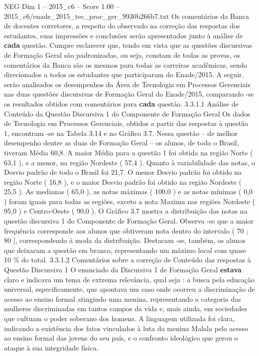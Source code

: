 \begin{textsample}{NEG Dim 1 – 2015\_c6 – Score 1.00 – 2015\_c6/enade\_2015\_tec\_proc\_ger\_9930b266b7.txt}
Os comentários da Banca de docentes corretores, a respeito do observado na correção das respostas dos estudantes, suas impressões e conclusões serão apresentados junto à análise de \textbf{cada} questão.
Cumpre esclarecer que, tendo em vista que as questões discursivas de Formação Geral são padronizadas, ou seja, constam de todas as provas, os comentários da Banca são os mesmos para todas as carreiras acadêmicas, sendo direcionados a todos os estudantes que participaram do Enade/2015.
A seguir, serão analisados os desempenhos da Área de Tecnologia em Processos Gerenciais nas duas questões discursivas de Formação Geral do Enade/2015, comparando -se os resultados obtidos com comentários para \textbf{cada} questão. 3.3.1.1 Análise de Conteúdo da Questão Discursiva 1 do Componente de Formação Geral Os dados de Tecnologia em Processos Gerenciais, obtidos a partir das respostas à questão 1, encontram -se na Tabela 3.14 e no Gráfico 3.7.
Nessa questão – de melhor desempenho dentre as duas de Formação Geral – os alunos, de todo o Brasil, tiveram Média 60,8.
A maior Média para a questão 1 foi obtida na região Norte ( 63,1 ), e a menor, na região Nordeste ( 57,4 ).
Quanto à variabilidade das notas, o Desvio padrão de todo o Brasil foi 21,7.
O menor Desvio padrão foi obtido na região Norte ( 16,8 ), e o maior Desvio padrão foi obtido na região Nordeste ( 25,5 ).
As medianas ( 65,0 ), as notas máximas ( 100,0 ) e as notas mínimas ( 0,0 ) foram iguais para todas as regiões, exceto a nota Maxima nas regiões Nordeste ( 95,0 ) e Centro-Oeste ( 90,0 ).
O Gráfico 3.7 mostra a distribuição das notas na questão discursiva 1 do Componente de Formação Geral.
Observa -se que a maior frequência corresponde aos alunos que obtiveram nota dentro do intervalo ( 70 ; 80 ], correspondendo à moda da distribuição.
Destacam -se, também, os alunos que deixaram a questão em branco, representando um máximo local com quase 10 \% do total. 3.3.1.2 Comentários sobre a correção de Conteúdo das respostas à Questão Discursiva 1 O enunciado da Discursiva 1 de Formação Geral \textbf{estava} claro e indicava um tema de extrema relevância, qual seja : a busca pela educação universal, especificamente, que apontava um caso onde ocorreu a discriminação de acesso ao ensino formal atingindo uma menina, representando a categoria das mulheres discriminadas em tantos campos da vida e, mais ainda, em sociedades que cultuam o poder soberano dos homens.
A linguagem utilizada foi clara, indicando a existência dos fatos vinculados à luta da menina Malala pelo acesso ao ensino formal das jovens do seu país, e o confronto ideológico que gerou o ataque à sua integridade física.

\end{textsample}
